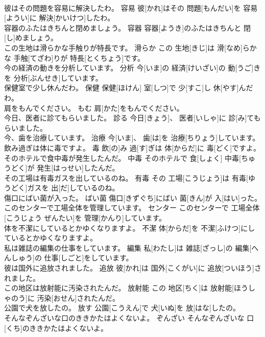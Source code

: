 \documentclass[8pt]{extreport}
\begin{document}
\begin{CJK}{UTF8}{min}
\\	彼はその問題を容易に解決したわ。	容易	彼[かれ]はその 問題[もんだい]を 容易[ようい]に 解決[かいけつ]したわ。	
\\	容器のふたはきちんと閉めましょう。	容器	容器[ようき]のふたはきちんと 閉[し]めましょう。	
\\	この生地は滑らかな手触りが特長です。	滑らか	この 生地[きじ]は 滑[なめ]らかな 手触[てざわ]りが 特長[とくちょう]です。	
\\	今の経済の動きを分析しています。	分析	今[いま]の 経済[けいざい]の 動[うご]きを 分析[ぶんせき]しています。	
\\	保健室で少し休んだわ。	保健	保健[ほけん] 室[しつ]で 少[すこ]し 休[やす]んだわ。	
\\	肩をもんでください。	もむ	肩[かた]をもんでください。	
\\	今日、医者に診てもらいました。	診る	今日[きょう]、 医者[いしゃ]に 診[み]てもらいました。	
\\	今、歯を治療しています。	治療	今[いま]、 歯[は]を 治療[ちりょう]しています。	
\\	飲み過ぎは体に毒ですよ。	毒	飲[の]み 過[す]ぎは 体[からだ]に 毒[どく]ですよ。	
\\	そのホテルで食中毒が発生したんだ。	中毒	そのホテルで 食[しょく] 中毒[ちゅうどく]が 発生[はっせい]したんだ。	
\\	その工場は有毒ガスを出しているのね。	有毒	その 工場[こうじょう]は 有毒[ゆうどく]ガスを 出[だ]しているのね。	
\\	傷口にばい菌が入った。	ばい菌	傷口[きずぐち]にばい 菌[きん]が 入[はい]った。	
\\	このセンターで工場全体を管理しています。	センター	このセンターで 工場全体[こうじょう ぜんたい]を 管理[かんり]しています。	
\\	体を不潔にしているとかゆくなりますよ。	不潔	体[からだ]を 不潔[ふけつ]にしているとかゆくなりますよ。	
\\	私は雑誌の編集の仕事をしています。	編集	私[わたし]は 雑誌[ざっし]の 編集[へんしゅう]の 仕事[しごと]をしています。	
\\	彼は国外に追放されました。	追放	彼[かれ]は 国外[こくがい]に 追放[ついほう]されました。	
\\	この地区は放射能に汚染されたんだ。	放射能	この 地区[ちく]は 放射能[ほうしゃのう]に 汚染[おせん]されたんだ。	
\\	公園で犬を放したの。	放す	公園[こうえん]で 犬[いぬ]を 放[はな]したの。	
\\	そんなぞんざいな口のききかたはよくないよ。	ぞんざい	そんなぞんざいな 口[くち]のききかたはよくないよ。	

\end{CJK}
\end{document}

